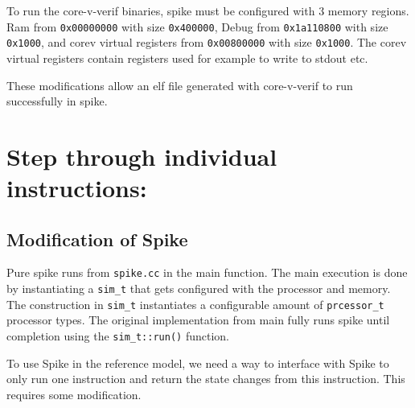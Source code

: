 To run the core-v-verif binaries, spike must be configured with 3 memory regions. Ram from \lstinline{0x00000000} with size \lstinline{0x400000}, Debug from \lstinline{0x1a110800} with size \lstinline{0x1000}, and corev virtual registers from \lstinline{0x00800000} with size \lstinline{0x1000}. The corev virtual registers contain registers used for example to write to stdout etc.

These modifications allow an elf file generated with core-v-verif to run successfully in spike.
%
%
%



\section{Step through individual instructions: }

\subsection{Modification of Spike}

Pure spike runs from \lstinline{spike.cc} in the main function. The main execution is done by instantiating a \lstinline{sim_t} that gets configured with the processor and memory. The construction in \lstinline{sim_t} instantiates a configurable amount of \lstinline{prcessor_t} processor types. The original implementation from main fully runs spike until completion using the \lstinline{sim_t::run()} function.

To use Spike in the reference model, we need a way to interface with Spike to only run one instruction and return the state changes from this instruction. This requires some modification. 

